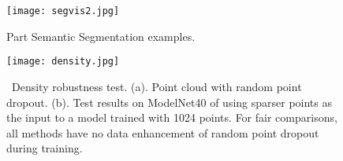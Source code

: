 \documentclass[letterpaper]{article} \usepackage{aaai21}  \usepackage{times}  \usepackage{helvet} \usepackage{courier}  \usepackage[hyphens]{url}  \usepackage{graphicx} \urlstyle{rm} \def\UrlFont{\rm}  \usepackage{natbib}  \usepackage{caption} \frenchspacing  \setlength{\pdfpagewidth}{8.5in}  \setlength{\pdfpageheight}{11in}  \usepackage{color}
\begin{document}
\begin{figure}[t]
\setlength{\abovecaptionskip}{0cm} 
	\begin{center}
	\texttt{[image: segvis2.jpg]} 
	\end{center}
	\caption{Part Semantic Segmentation examples.}
	\label{seg_vis}
\end{figure}


\begin{figure}[t]
	\begin{center}
	\texttt{[image: density.jpg]}
	\end{center}
	\caption{~Density robustness test. (a). Point cloud with random point dropout. (b). Test results on ModelNet40 of using sparser points as the input to a model
trained with 1024 points. For fair comparisons, all methods have no data enhancement of random point dropout during training.}
	\label{droupt}

\end{figure}
\begin{table}[t]
\begin{center}
	 \caption{Geometry-Disentangled complementary effect to supplement KNN information in GDANet on ModelNet40. ~`knn' indicates KNN aggregation, ~`self' means the input point cloud is fused with itself by self-attention, ~`sharp' and ~`gentle' denote the input point cloud is fused with features of sharp and gentle variation, ~`voting' is the voting strategy during testing, respectively.}
	\label{ablation_study}
	\end{center}
\end{table}
\end{document}
